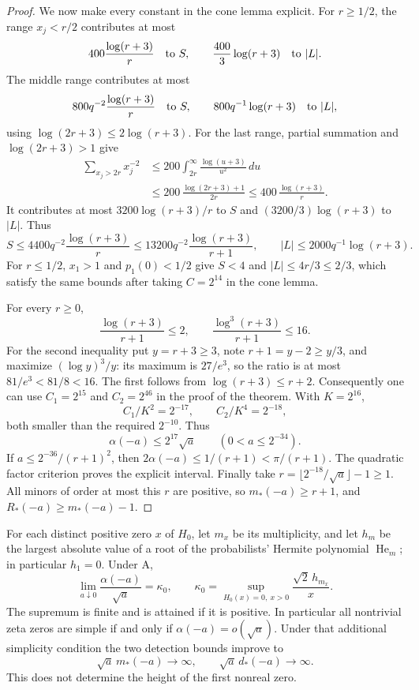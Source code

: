 \begin{proof}
We now make every constant in the cone lemma explicit.
For $r\ge1/2$, the range $x_j<r/2$ contributes at most
\[
       400\frac{\log(r+3)}r\quad\hbox{to }S,
       \qquad \frac{400}3\log(r+3)\quad\hbox{to }|L|.
\]
The middle range contributes at most
\[
       800q^{-2}\frac{\log(r+3)}r\quad\hbox{to }S,
       \qquad800q^{-1}\log(r+3)\quad\hbox{to }|L|,
\]
using $\log(2r+3)\le2\log(r+3)$.
For the last range, partial summation and
$\log(2r+3)>1$ give
\begin{align*}
 \sum_{x_j>2r}x_j^{-2}
 &\le200\int_{2r}^\infty\frac{\log(u+3)}{u^2}\,du\\
 &\le200\,\frac{\log(2r+3)+1}{2r}
 \le400\,\frac{\log(r+3)}r.
\end{align*}
It contributes at most
$3200\log(r+3)/r$ to $S$ and
$(3200/3)\log(r+3)$ to $|L|$.
Thus
\[
 S\le4400q^{-2}\frac{\log(r+3)}r
       \le13200q^{-2}\frac{\log(r+3)}{r+1},
       \qquad |L|\le2000q^{-1}\log(r+3).
\]
For $r\le1/2$, $x_1>1$ and $p_1(0)<1/2$ give
$S<4$ and $|L|\le4r/3\le2/3$, which satisfy the same
bounds after taking $C=2^{14}$ in the cone lemma.

For every $r\ge0$,
\[
 \frac{\log(r+3)}{r+1}\le2,\qquad
 \frac{\log^3(r+3)}{r+1}\le16.
\]
For the second inequality put $y=r+3\ge3$, note
$r+1=y-2\ge y/3$, and maximize $(\log y)^3/y$:
its maximum is $27/e^3$, so the ratio is at most
$81/e^3<81/8<16$. The first follows from
$\log(r+3)\le r+2$.
Consequently one can use $C_1=2^{15}$ and $C_2=2^{46}$
in the proof of the theorem. With $K=2^{16}$,
\[
             C_1/K^2=2^{-17},\qquad C_2/K^4=2^{-18},
\]
both smaller than the required $2^{-10}$. Thus
\[
 \alpha(-a)\le2^{17}\sqrt a\qquad(0<a\le2^{-34}).
\]
If $a\le2^{-36}/(r+1)^2$, then
$2\alpha(-a)\le1/(r+1)<\pi/(r+1)$.
The quadratic factor criterion proves the explicit interval.
Finally take
$r=\lfloor2^{-18}/\sqrt a\rfloor-1\ge1$.
All minors of order at most this $r$ are positive, so
$m_*(-a)\ge r+1$, and $R_*(-a)\ge m_*(-a)-1$.
\end{proof}

\begin{corollary}
For each distinct positive zero $x$ of $H_0$, let $m_x$ be its
multiplicity, and let $h_m$ be the largest absolute value of a
root of the probabilists' Hermite polynomial $\operatorname{He}_m$;
in particular $h_1=0$. Under A,
\begin{equation}\label{eq:analytic-endpoint-angular-limit}
       \lim_{a\downarrow0}\frac{\alpha(-a)}{\sqrt a}
          =\kappa_0,\qquad
       \kappa_0=\sup_{H_0(x)=0,\ x>0}\frac{\sqrt2\,h_{m_x}}x.
\end{equation}
The supremum is finite and is attained if it is positive.
In particular all nontrivial zeta zeros are simple if and only
if $\alpha(-a)=o(\sqrt a)$. Under that additional simplicity
condition the two detection bounds improve to
\[
                     \sqrt a\,m_*(-a)\longrightarrow\infty,
              \qquad \sqrt a\,d_*(-a)\longrightarrow\infty.
\]
This does not determine the height of the first nonreal zero.
\end{corollary}

